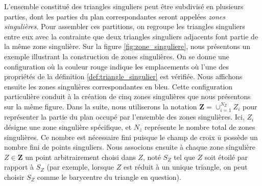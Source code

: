 L'ensemble constitué des triangles singuliers peut être subdivisé en plusieurs parties, dont les parties du plan correspondantes seront appelées \emph{zones singulières}. Pour assembler ces partitions, on regroupe les triangles singuliers entre eux avec la contrainte que deux triangles singuliers adjacents font partie de la même zone singulière. Sur la figure \ref{fig:zone_singuliere}, nous présentons un exemple illustrant la construction de zones singulières. On se donne une configuration où la couleur rouge indique les emplacements où l'une des propriétés de la définition \ref{def:triangle_singulier} est vérifiée. Nous affichons ensuite les zones singulières correspondantes en bleu. Cette configuration particulière conduit à la création de cinq zones singulières que nous présentons sur la même figure. Dans la suite, nous utiliserons la notation $\mathbf{Z}=\cup_{i=1}^{N_Z}Z_i$ pour représenter la partie du plan occupé par l'ensemble des zones singulières. Ici, $Z_i$ désigne une zone singulière spécifique, et $N_z$ représente le nombre total de zones singulières. Ce nombre est nécessaire fini puisque le champ de croix $\bar{u}$ possède un nombre fini de points singuliers. Nous associons ensuite à chaque zone singulière $Z\in \mathbf{Z}$ un point arbitrairement choisi dans $Z$, noté $S_Z$ tel que $Z$ soit étoilé par rapport à $S_Z$ (par exemple, lorsque $Z$ est réduit à un unique triangle, on peut choisir $S_Z$ comme le barycentre du triangle en question).

